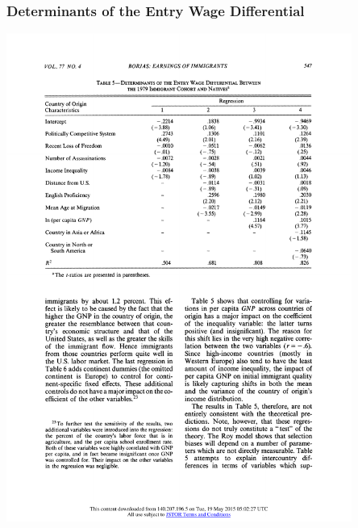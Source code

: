 \documentclass[10pt]{beamer}
\begin{document}
\begin{frame}[c]\frametitle{Determinants of the Entry Wage Differential}

\centerline{\includegraphics[width=0.85\textwidth]{DetReg1.pdf}}

\end{frame}
\end{document}
